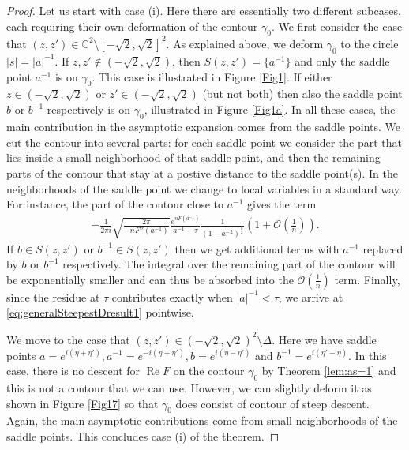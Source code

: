 \documentclass[%
 jmp,
cp,  %
 amsmath,amsthm,amssymb,%
 reprint,%
onecolumn]{revtex4-2}
\renewcommand{\Re}{\operatorname{Re}}
\begin{document}
\begin{proof} Let us start with case (i). Here there are essentially two different subcases, each requiring their own deformation of the contour $\gamma_0$. We first consider the case that $(z,z')\in \mathbb C^2\setminus [-\sqrt 2, \sqrt 2]^2$. As explained above, we deform $\gamma_0$ to the circle $|s|=|a|^{-1}$. If $z,z'\not\in (-\sqrt 2, \sqrt 2)$, then $S(z,z')=\{a^{-1}\}$ and only the saddle point $a^{-1}$ is on $\gamma_0$. This case is illustrated in Figure \ref{Fig1}. If either $z\in (-\sqrt 2, \sqrt 2)$ or $z'\in (-\sqrt 2, \sqrt 2)$  (but not both) then also the saddle point $b$ or $b^{-1}$ respectively  is on  $\gamma_0$, illustrated in Figure \ref{Fig1a}. In all these cases, the main contribution in the asymptotic expansion comes from the saddle points. We cut the contour into several parts:  for each saddle point we consider the part that lies inside a small neighborhood of that saddle point, and then the remaining parts of the contour that stay at a postive distance to the saddle point(s). In the neighborhoods of the saddle point we  change to local variables in a standard way. For instance, the part of the contour close to $a^{-1}$ gives the term
\begin{align} \label{eq:saddleContributiana-}
-\frac{1}{2\pi i} \sqrt{\frac{2\pi}{-n F''(a^{-1})}} \frac{e^{n F(a^{-1})}}{a^{-1}-\tau} \frac{1}{(1-a^{-2})^\frac{d}{2}} \left(1+\mathcal O\left(\frac{1}{n}\right)\right).
\end{align}
If $b\in S(z,z')$ or $b^{-1}\in S(z,z')$ then we get additional terms with $a^{-1}$ replaced by $b$ or $b^{-1}$ respectively.  The integral over the remaining part of the contour will be exponentially smaller and can thus be absorbed into the $\mathcal O\left(\frac{1}{n}\right)$ term. Finally, since the residue at $\tau$ contributes exactly when $|a|^{-1}<\tau$, we arrive at \eqref{eq:generalSteepestDresult1} pointwise.  

We move to the case that $(z,z')\in (-\sqrt 2, \sqrt 2)^2\setminus \Delta$. Here we have saddle points $a = e^{i(\eta+\eta')}, a^{-1}=e^{-i(\eta+\eta')}, b=e^{i(\eta-\eta')}$ and $b^{-1}=e^{i(\eta'-\eta)}$. In this case, there is no descent for $\Re F$ on the contour $\gamma_0$ by Theorem \ref{lem:as=1} and this is not a contour that we can use. However, we can slightly deform it as shown in Figure \ref{Fig17} so that $\gamma_0$ does consist of contour of steep descent. Again, the main asymptotic contributions come from small neighborhoods of the saddle points.  This concludes case (i) of the theorem. 


\end{proof}
\end{document}
